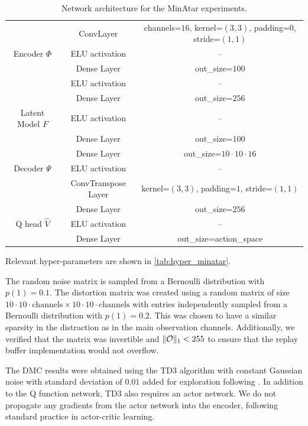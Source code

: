 \begin{table}[t]
\begin{center}
\begin{tabular}{c|c|c}
     & ConvLayer & channels=$16$, kernel=$(3,3)$, padding=$0$, stride=$(1,1)$ \\
     Encoder $\Phi$ & ELU activation & -- \\
     & Dense Layer & out\_size=$100$\\
     & ELU activation & -- \\\hline
     & Dense Layer & out\_size=$256$ \\
     Latent Model $F$ & ELU activation & -- \\
     & Dense Layer & out\_size=$100$\\\hline
     & Dense Layer & out\_size=$10\cdot10\cdot16$\\
     Decoder $\Psi$ & ELU activation & -- \\
     & ConvTranspose Layer & kernel=$(3,3)$, padding=$1$,  stride=$(1,1)$\\\hline
     & Dense Layer & out\_size=$256$ \\
     Q head $\hat{V}$ & ELU activation & --\\
     & Dense Layer & out\_size=action\_space
\end{tabular}
\end{center}
\caption{Network architecture for the MinAtar experiments.}
\label{tab:net_minatar}
\end{table}

Relevant hyper-parameters are shown in \autoref{tab:hyper_minatar}.

The random noise matrix is sampled from a Bernoulli distribution with $p(1) = 0.1$.
The distortion matrix was created using a random matrix of size $10\cdot10\cdot\mathrm{channels} \times 10\cdot10\cdot\mathrm{channels}$ with entries independently sampled from a Bernoulli distribution with $p(1) = 0.2$. 
This was chosen to have a similar sparsity in the distraction as in the main observation channels.
Additionally, we verified that the matrix was invertible and $\lVert {\mathcal{O}} \rVert_1 < 255$ to ensure that the replay buffer implementation would not overflow.


The DMC results were obtained using the TD3 algorithm \parencite{td3} with constant Gaussian noise with standard deviation of $0.01$ added for exploration following \textcite{yarats2021image}. In addition to the Q function network, TD3 also requires an actor network. We do not propagate any gradients from the actor network into the encoder, following standard practice in actor-critic learning.

